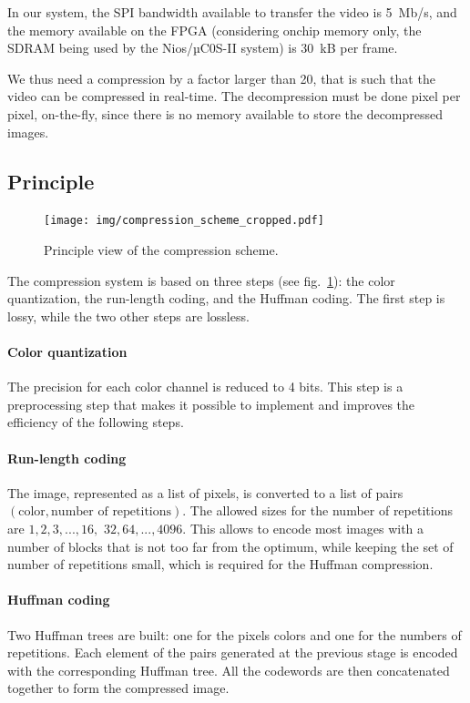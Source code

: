 \documentclass[english, DIV=13]{scrreprt}
\begin{document}
In our system, the SPI bandwidth available to transfer the video is \SI{5}{Mb/s},
and the memory available on the FPGA (considering onchip memory only, the SDRAM
being used by the Nios/µC0S-II system) is \SI{30}{kB} per frame.

We thus need a compression by a factor larger than 20, that is such that
the video can be compressed in real-time. The decompression must be done
pixel per pixel, on-the-fly, since there is no memory available to store the
decompressed images.

\subsection{Principle}

\begin{figure}[bth]
    \centering
    \texttt{[image: img/compression\_scheme\_cropped.pdf]}
    \caption{Principle view of the compression scheme.}
    \label{fig:compression}
\end{figure}

The compression system is based on three steps (see fig.~\ref{fig:compression}):
the color quantization, the run-length coding, and the Huffman coding. The first
step is lossy, while the two other steps are lossless.

\paragraph{Color quantization} The precision for each color channel is
reduced to 4 bits. This step is a preprocessing step that makes it possible
to implement and improves the efficiency of the following steps.

\paragraph{Run-length coding} The image, represented as a list of pixels,
is converted to a list of pairs $(\text{color}, \text{number of repetitions})$.
The allowed sizes for the number of repetitions are
$1, 2, 3, ..., 16,$ $32, 64, ..., 4096$. This allows to encode most images with
a number of blocks that is not too far from the optimum, while keeping the set
of number of repetitions small, which is required for the Huffman compression.

\paragraph{Huffman coding} Two Huffman trees are built: one for the pixels colors
and one for the numbers of repetitions. Each element of the pairs generated
at the previous stage is encoded with the corresponding Huffman tree.
All the codewords are then concatenated together to form the compressed image.
\end{document}
